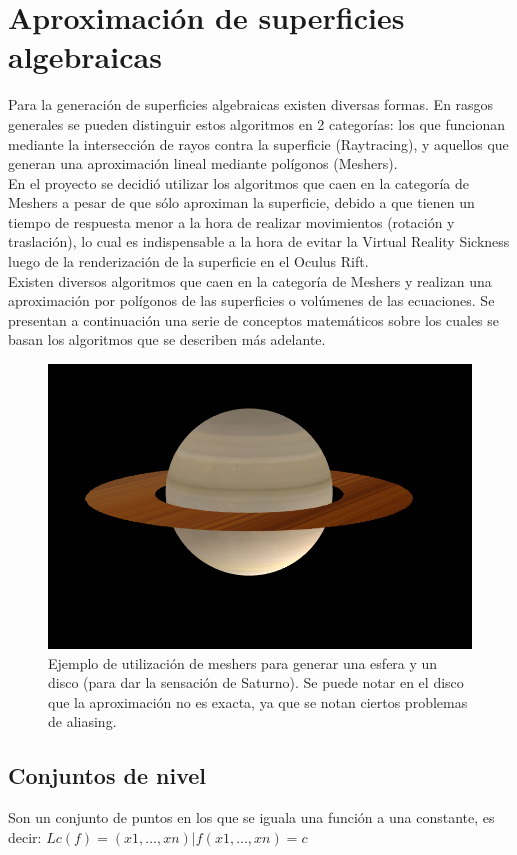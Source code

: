 \documentclass[12pt]{article}
\begin{document}
\section{Aproximación de superficies algebraicas}
Para la generación de superficies algebraicas existen diversas formas. En rasgos generales se pueden distinguir estos algoritmos en 2 categorías: los que funcionan mediante la intersección de rayos contra la superficie (Raytracing), y aquellos que generan una aproximación lineal mediante polígonos (Meshers).
\\En el proyecto se decidió utilizar los algoritmos que caen en la categoría de Meshers\cite{mykola1}\cite{mykola2} a pesar de que sólo aproximan la superficie, debido a que tienen un tiempo de respuesta menor a la hora de realizar movimientos (rotación y traslación), lo cual es indispensable a la hora de evitar la Virtual Reality Sickness luego de la renderización de la superficie en el Oculus Rift.
\\Existen diversos algoritmos que caen en la categoría de Meshers y realizan una aproximación por polígonos de las superficies o volúmenes de las ecuaciones. Se presentan a continuación una serie de conceptos matemáticos sobre los cuales se basan los algoritmos que se describen más adelante.
\begin{figure}[h]
\includegraphics[width=\textwidth]{saturno.png}
\caption{Ejemplo de utilización de meshers para generar una esfera y un disco (para dar la sensación de Saturno). Se puede notar en el disco que la aproximación no es exacta, ya que se notan ciertos problemas de aliasing.}
\end{figure}
\clearpage
\subsection{Conjuntos de nivel}
Son un conjunto de puntos en los que se iguala una función a una constante, es decir:
$Lc(f) = {(x1,...,xn) | f(x1,...,xn)  = c}$ \cite{implicitas}
\end{document}
